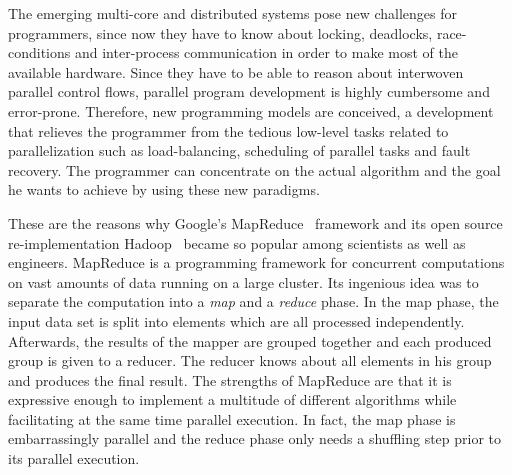 The emerging multi-core and distributed systems pose new challenges for programmers, since now they have to know about locking, deadlocks, race-conditions and inter-process communication in order to make most of the available hardware.
Since they have to be able to reason about interwoven parallel control flows, parallel program development is highly cumbersome and error-prone.
Therefore, new programming models are conceived, a development that relieves the programmer from the tedious low-level tasks related to parallelization such as load-balancing, scheduling of parallel tasks and fault recovery.
The programmer can concentrate on the actual algorithm and the goal he wants to achieve by using these new paradigms.

These are the reasons why Google's MapReduce~\cite{dean:c2008a} framework and its open source re-implementation Hadoop~\cite{hadoop:2008a} became so popular among scientists as well as engineers.
MapReduce is a programming framework for concurrent computations on vast amounts of data running on a large cluster.
Its ingenious idea was to separate the computation into a \emph{map} and a \emph{reduce} phase.
In the map phase, the input data set is split into elements which are all processed independently.
Afterwards, the results of the mapper are grouped together and each produced group is given to a reducer.
The reducer knows about all elements in his group and produces the final result.
The strengths of MapReduce are that it is expressive enough to implement a multitude of different algorithms while facilitating at the same time parallel execution.
In fact, the map phase is embarrassingly parallel and the reduce phase only needs a shuffling step prior to its parallel execution.


